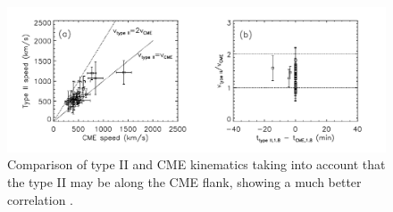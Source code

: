 \begin{figure}[h!]
\begin{center}
\includegraphics[trim=0cm 0cm 0cm 0cm, scale=0.4]{images/mancuso_kins2}
\caption[Comparison of CME and type II height-time kinematics, corrected for CME flank shock assumption]{Comparison of type II and CME kinematics taking into account that the type II may be along the CME flank, showing a much better correlation \citep{mancuso2004}.}
\label{fig:mancuso_kins}
\end{center}
\end{figure}

